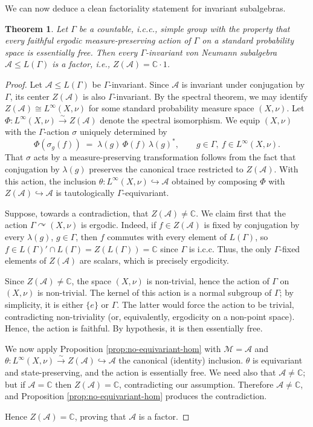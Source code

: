 \documentclass[11pt]{amsart}
\newtheorem{theorem}{Theorem}[section]
\theoremstyle{definition}
\newcommand{\C}{\mathbb{C}}
\newcommand{\cA}{\mathcal{A}}
\newcommand{\cM}{\mathcal{M}}
\begin{document}
We can now deduce a clean factoriality statement for invariant subalgebras.

\begin{theorem}\label{thm:factoriality}
Let $\Gamma$ be a countable, i.c.c., simple group with the property that every faithful ergodic measure-preserving action of $\Gamma$ on a standard probability space is essentially free. Then every $\Gamma$-invariant von Neumann subalgebra $\cA \le L(\Gamma)$ is a factor, i.e., $Z(\cA) = \C \cdot 1$.
\end{theorem}

\begin{proof}
Let $\cA \le L(\Gamma)$ be $\Gamma$-invariant. Since $\cA$ is invariant under conjugation by $\Gamma$, its center $Z(\cA)$ is also $\Gamma$-invariant. By the spectral theorem, we may identify $Z(\cA) \cong L^\infty(X, \nu)$ for some standard probability measure space $(X, \nu)$. Let $\Phi \colon L^\infty(X,\nu) \xrightarrow{\sim} Z(\cA)$ denote the 
spectral isomorphism. We equip $(X,\nu)$ with the $\Gamma$-action $\sigma$ 
uniquely determined by 
\[
  \Phi(\sigma_g(f)) \;=\; \lambda(g)\,\Phi(f)\,\lambda(g)^*, 
  \qquad g \in \Gamma,\ f \in L^\infty(X,\nu).
\]
That $\sigma$ acts by a measure-preserving transformation follows from the 
fact that conjugation by $\lambda(g)$ preserves the canonical trace 
restricted to $Z(\cA)$. With this action, the inclusion 
$\theta \colon L^\infty(X,\nu) \hookrightarrow \cA$ obtained by composing 
$\Phi$ with $Z(\cA) \hookrightarrow \cA$ is tautologically 
$\Gamma$-equivariant.

Suppose, towards a contradiction, that $Z(\cA) \neq \C$. We claim first that the action $\Gamma \curvearrowright (X, \nu)$ is ergodic. Indeed, if $f \in Z(\cA)$ is fixed by conjugation by every $\lambda(g)$, $g \in \Gamma$, then $f$ commutes with every element of $L(\Gamma)$, so $f \in L(\Gamma)' \cap L(\Gamma) = Z(L(\Gamma)) = \C$ since $\Gamma$ is i.c.c. Thus, the only $\Gamma$-fixed elements of $Z(\cA)$ are scalars, which is precisely ergodicity.

Since $Z(\cA) \neq \C$, the space $(X, \nu)$ is non-trivial, hence the action of $\Gamma$ on $(X, \nu)$ is non-trivial. The kernel of this action is a normal subgroup of $\Gamma$; by simplicity, it is either $\{e\}$ or $\Gamma$. The latter would force the action to be trivial, contradicting non-triviality (or, equivalently, ergodicity on a non-point space). Hence, the action is faithful. By hypothesis, it is then essentially free.

We now apply Proposition \ref{prop:no-equivariant-hom} with $\cM = \cA$ and $\theta \colon L^\infty(X, \nu) \xrightarrow{\;\sim\;} Z(\cA) \hookrightarrow \cA$ the canonical (identity) inclusion. $\theta$ is equivariant and state-preserving, and the action is essentially free. We need also that $\cA \neq \C$; but if $\cA = \C$ then $Z(\cA) = \C$, contradicting our assumption. Therefore $\cA \neq \C$, and Proposition \ref{prop:no-equivariant-hom} produces the contradiction.

Hence $Z(\cA) = \C$, proving that $\cA$ is a factor.
\end{proof}
\end{document}
